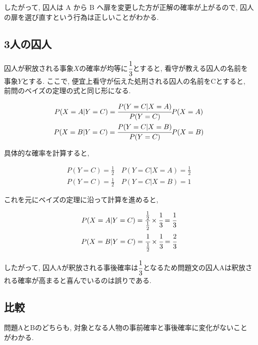 \documentclass{article}
\begin{document}
したがって, 囚人は A から B へ扉を変更した方が正解の確率が上がるので, 囚人の扉を選び直すという行為は正しいことがわかる.

\subsection{3人の囚人}

囚人が釈放される事象$X$の確率が均等に$\cfrac{1}{3}$とすると, 看守が教える囚人の名前を事象$Y$とする. ここで, 便宜上看守が伝えた処刑される囚人の名前をCとすると, 前問のベイズの定理の式と同じ形になる.

\begin{center}
	\begin{gather}
		P(X = A | Y = C) = \cfrac{P(Y = C | X = A)}{P(Y = C)} P(X = A) \\
		P(X = B | Y = C) = \cfrac{P(Y = C | X = B)}{P(Y = C)} P(X = B)
	\end{gather}
\end{center}

具体的な確率を計算すると,

\begin{center}
	\begin{gather}
		P(Y = C) = \frac{1}{2}\quad P(Y = C | X = A) = \frac{1}{2} \\
		P(Y = C) = \frac{1}{2}\quad P(Y = C | X = B) = 1
	\end{gather}
\end{center}

これを元にベイズの定理に沿って計算を進めると,

\begin{center}
	\begin{gather}
		P(X = A | Y = C) = \cfrac{\frac{1}{2}}{\frac{1}{2}} \times \cfrac{1}{3} = \cfrac{1}{3} \\
		P(X = B | Y = C) = \cfrac{1}{\frac{1}{2}} \times \cfrac{1}{3} = \cfrac{2}{3}
	\end{gather}
\end{center}

したがって, 囚人Aが釈放される事後確率は$\cfrac{1}{3}$となるため問題文の囚人Aは釈放される確率が高まると喜んでいるのは誤りである.

\subsection{比較}

問題AとBのどちらも, 対象となる人物の事前確率と事後確率に変化がないことがわかる.
\end{document}
